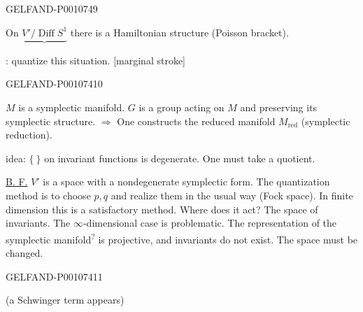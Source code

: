 \begin{GelfandAdjacentEvidence}{GELFAND-P001074}{9}


On $\underbrace{V'/\operatorname{Diff}S^1}$ there is a Hamiltonian structure (Poisson bracket).

: quantize this situation.
[marginal stroke]
\end{GelfandAdjacentEvidence}
\begin{GelfandAdjacentEvidence}{GELFAND-P001074}{10}


 $M$ is a symplectic manifold. $G$ is a group acting on $M$ and preserving its symplectic structure. $\Rightarrow$ One constructs the reduced manifold $M_{\mathrm{red}}$ (symplectic reduction).

idea: $\{\ \}$ on invariant functions is degenerate. One must take a quotient.

\uline{B. F.} $V'$ is a space with a nondegenerate symplectic form.
The quantization method is to choose $p,q$ and realize them in the usual way (Fock space).
In finite dimension this is a satisfactory method. Where does it act? The space of invariants.
The $\infty$-dimensional case is problematic.
The representation of the symplectic manifold\textsuperscript{?} is projective, and invariants do not exist. The space must be changed.
\end{GelfandAdjacentEvidence}
\begin{GelfandAdjacentEvidence}{GELFAND-P001074}{11}

(a Schwinger term appears)
\end{GelfandAdjacentEvidence}



